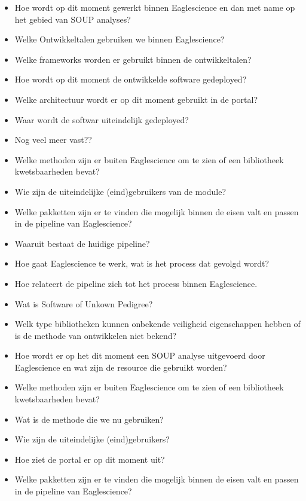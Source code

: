 \begin{itemize}
  \item Hoe wordt op dit moment gewerkt binnen Eaglescience en dan met name op het gebied van SOUP analyses?
  \item Welke Ontwikkeltalen gebruiken we binnen Eaglescience?
  \item Welke frameworks worden er gebruikt binnen de ontwikkeltalen?
  \item Hoe wordt op dit moment de ontwikkelde software gedeployed?
  \item Welke architectuur wordt er op dit moment gebruikt in de portal?
  \item Waar wordt de softwar uiteindelijk gedeployed?
  \item Nog veel meer vast??






\item Welke methoden zijn er buiten Eaglescience om te zien of een bibliotheek kwetsbaarheden bevat?


\item Wie zijn de uiteindelijke (eind)gebruikers van de module?

\item Welke pakketten zijn er te vinden die mogelijk binnen de eisen valt en passen in de pipeline van Eaglescience?
\item Waaruit bestaat de huidige pipeline?
\item Hoe gaat Eaglescience te werk, wat is het process dat gevolgd wordt?
\item Hoe relateert de pipeline zich tot het process binnen Eaglescience.


\item Wat is Software of Unkown Pedigree?
\item Welk type bibliotheken kunnen onbekende veiligheid eigenschappen hebben of is de methode van ontwikkelen niet bekend?

\item Hoe wordt er op het dit moment een SOUP analyse uitgevoerd door Eaglescience en wat zijn de resource die gebruikt worden?
\item Welke methoden zijn er buiten Eaglescience om te zien of een bibliotheek kwetsbaarheden bevat?
\item Wat is de methode die we nu gebruiken?
\item Wie zijn de uiteindelijke (eind)gebruikers?
\item Hoe ziet de portal er op dit moment uit?
\item Welke pakketten zijn er te vinden die mogelijk binnen de eisen valt en passen in de pipeline van Eaglescience?
\end{itemize}


